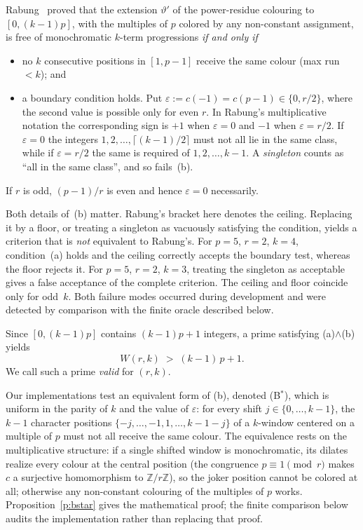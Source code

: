 Rabung~\cite{rabung1979} proved that the extension $\vartheta'$ of the
power-residue colouring to $[0,(k-1)p]$, with the multiples of $p$ colored by any
non-constant assignment, is free of monochromatic $k$-term progressions
\emph{if and only if}
\begin{itemize}
\item[(a)] no $k$ consecutive positions in $[1,p-1]$ receive the same colour
  (max run $<k$); and
\item[(b)] a boundary condition holds. Put
  $\varepsilon:=c(-1)=c(p-1)\in\{0,r/2\}$, where the second value is possible
  only for even $r$. In Rabung's multiplicative notation the corresponding
  sign is $+1$ when $\varepsilon=0$ and $-1$ when $\varepsilon=r/2$. If
  $\varepsilon=0$ the integers
  $1,2,\dots,\lceil (k-1)/2 \rceil$ must not all lie in the same class, while if
  $\varepsilon=r/2$ the same is required of $1,2,\dots,k-1$. A \emph{singleton}
  counts as ``all in the same class'', and so fails~(b).
\end{itemize}
If $r$ is odd, $(p-1)/r$ is even and hence $\varepsilon=0$ necessarily.

\begin{remark}\label{r:ceiling}
Both details of~(b) matter. Rabung's bracket here denotes the ceiling.
Replacing it by a floor, or treating a
singleton as vacuously satisfying the condition, yields a criterion that is
\emph{not} equivalent to Rabung's.  For $p=5$, $r=2$, $k=4$, condition~(a) holds and the ceiling
correctly accepts the boundary test, whereas the floor rejects it. For
$p=5$, $r=2$, $k=3$, treating the singleton as acceptable gives a false
acceptance of the complete criterion.  The ceiling and floor coincide only for odd~$k$.
Both failure modes occurred during development and were detected by comparison
with the finite oracle described below.
\end{remark}
Since $[0,(k-1)p]$ contains $(k-1)p+1$ integers, a prime satisfying
(a)$\wedge$(b) yields
\begin{equation}\label{eq:bound}
  W(r,k) \;>\; (k-1)\,p+1 .
\end{equation}
We call such a prime \emph{valid} for $(r,k)$.

Our implementations test an equivalent form of (b), denoted (B$^{*}$), which is
uniform in the parity of $k$ and the value of $\varepsilon$: for every shift
$j\in\{0,\dots,k-1\}$, the $k-1$ character positions
$\{-j,\dots,-1,1,\dots,k-1-j\}$ of a $k$-window centered on a multiple of $p$
must not all receive the same colour. The equivalence rests on the
multiplicative structure: if a single shifted window is monochromatic, its
dilates realize every colour at the central position (the congruence
$p\equiv1\pmod r$ makes $c$ a surjective homomorphism to $\mathbb Z/r\mathbb Z$), so the joker position cannot be
colored at all; otherwise any non-constant colouring of the multiples of $p$
works.  Proposition~\ref{p:bstar} gives the mathematical proof; the finite
comparison below audits the implementation rather than replacing that proof.

